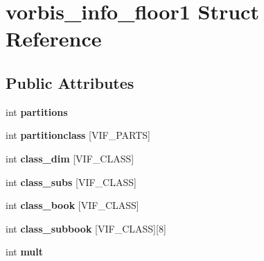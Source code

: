 \hypertarget{structvorbis__info__floor1}{\section{vorbis\+\_\+info\+\_\+floor1 Struct Reference}
\label{structvorbis__info__floor1}
}
\subsection*{Public Attributes}
\begin{DoxyCompactItemize}
\item 
\hypertarget{structvorbis__info__floor1_a0888c238296237fca49e63f4c684b4b1}{int {\bfseries partitions}}\label{structvorbis__info__floor1_a0888c238296237fca49e63f4c684b4b1}

\item 
\hypertarget{structvorbis__info__floor1_a2e4121f3de34efb3d3092cfacd9e1913}{int {\bfseries partitionclass} \mbox{[}V\+I\+F\+\_\+\+P\+A\+R\+T\+S\mbox{]}}\label{structvorbis__info__floor1_a2e4121f3de34efb3d3092cfacd9e1913}

\item 
\hypertarget{structvorbis__info__floor1_aafa4ec3e13ed54e77effbd1c2f550e00}{int {\bfseries class\+\_\+dim} \mbox{[}V\+I\+F\+\_\+\+C\+L\+A\+S\+S\mbox{]}}\label{structvorbis__info__floor1_aafa4ec3e13ed54e77effbd1c2f550e00}

\item 
\hypertarget{structvorbis__info__floor1_a22f4b03eb391dcdceebbe2675195f38a}{int {\bfseries class\+\_\+subs} \mbox{[}V\+I\+F\+\_\+\+C\+L\+A\+S\+S\mbox{]}}\label{structvorbis__info__floor1_a22f4b03eb391dcdceebbe2675195f38a}

\item 
\hypertarget{structvorbis__info__floor1_a4765de87c6afc7a526684e1f1210556d}{int {\bfseries class\+\_\+book} \mbox{[}V\+I\+F\+\_\+\+C\+L\+A\+S\+S\mbox{]}}\label{structvorbis__info__floor1_a4765de87c6afc7a526684e1f1210556d}

\item 
\hypertarget{structvorbis__info__floor1_a87236d836164ba5c67ba79ec90e67fae}{int {\bfseries class\+\_\+subbook} \mbox{[}V\+I\+F\+\_\+\+C\+L\+A\+S\+S\mbox{]}\mbox{[}8\mbox{]}}\label{structvorbis__info__floor1_a87236d836164ba5c67ba79ec90e67fae}

\item 
\hypertarget{structvorbis__info__floor1_a431d5bb1a6aec9746726cfdf737d5ac0}{int {\bfseries mult}}\label{structvorbis__info__floor1_a431d5bb1a6aec9746726cfdf737d5ac0}


\end{DoxyCompactItemize}

